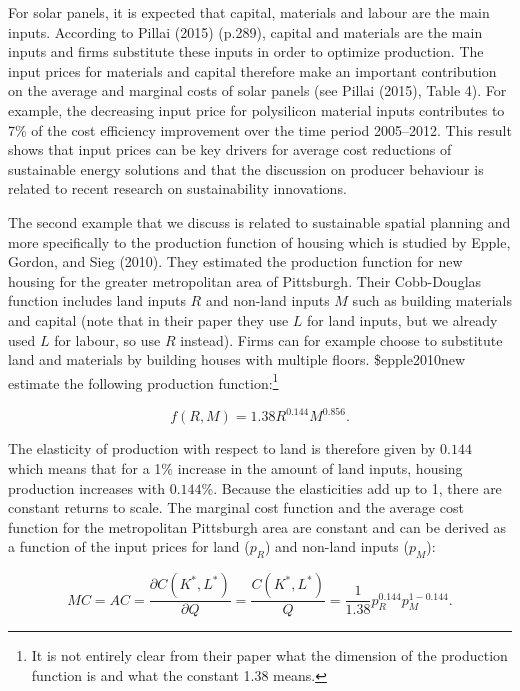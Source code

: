 \documentclass[
]{book}
\begin{document}
For solar panels, it is expected that capital, materials and labour are the main inputs. According to Pillai (2015) (p.289), capital and materials are the main inputs and firms substitute these inputs in order to optimize production. The input prices for materials and capital therefore make an important contribution on the average and marginal costs of solar panels (see Pillai (2015), Table 4). For example, the decreasing input price for polysilicon material inputs contributes to 7\% of the cost efficiency improvement over the time period 2005--2012. This result shows that input prices can be key drivers for average cost reductions of sustainable energy solutions and that the discussion on producer behaviour is related to recent research on sustainability innovations.

The second example that we discuss is related to sustainable spatial planning and more specifically to the production function of housing which is studied by Epple, Gordon, and Sieg (2010). They estimated the production function for new housing for the greater metropolitan area of Pittsburgh. Their Cobb-Douglas function includes land inputs \(R\) and non-land inputs \(M\) such as building materials and capital (note that in their paper they use \(L\) for land inputs, but we already used \(L\) for labour, so use \(R\) instead). Firms can for example choose to substitute land and materials by building houses with multiple floors. \$epple2010new estimate the following production function:\footnote{It is not entirely clear from their paper what the dimension of the production function is and what the constant 1.38 means.}

\begin{equation}
f(R,M) = 1.38 R^{0.144} M^{0.856}.
\end{equation}

The elasticity of production with respect to land is therefore given by \(0.144\) which means that for a 1\% increase in the amount of land inputs, housing production increases with \(0.144\)\%. Because the elasticities add up to 1, there are constant returns to scale. The marginal cost function and the average cost function for the metropolitan Pittsburgh area are constant and can be derived as a function of the input prices for land (\(p_R\)) and non-land inputs (\(p_M\)):

\begin{equation}
MC = AC = \frac{\partial C(K^\ast,L^\ast)}{\partial Q} = \frac{C(K^\ast,L^\ast)}{Q}  = \frac{1}{1.38}p_R^{0.144}p_M^{1- 0.144}.
\end{equation}
\end{document}
